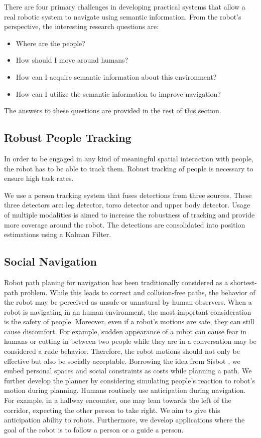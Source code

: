 \documentclass[12pt]{gatech-thesis}
\begin{document}
There are four primary challenges in developing practical systems that allow a real robotic system to navigate using semantic information. From the robot's perspective, the interesting research questions are:

\begin{itemize}
\item Where are the people?
\item How should I move around humans?
\item How can I acquire semantic information about this environment?
\item How can I utilize the semantic information to improve navigation?
\end{itemize}

The answers to these questions are provided in the rest of this section.

\subsection{Robust People Tracking}

In order to be engaged in any kind of meaningful spatial interaction with people, the robot has to be able to track them. Robust tracking of people is necessary to ensure high task rates.

We use a person tracking system that fuses detections from three sources. These three detectors are: leg detector, torso detector and upper body detector. Usage of multiple modalities is aimed to increase the robustness of tracking and provide more coverage around the robot. The detections are consolidated into position estimations using a Kalman Filter.

\subsection{Social Navigation}

Robot path planing for navigation has been traditionally considered as a shortest-path problem. While this leads to correct and collision-free paths, the behavior of the robot may be perceived as unsafe or unnatural by human observers. When a robot is navigating in an human environment, the most important consideration is the safety of people. Moreover, even if a robot's motions are safe, they can still cause discomfort. For example, sudden appearance of a robot can cause fear in humans or cutting in between two people while they are in a conversation may be considered a rude behavior. Therefore, the robot motions should not only be effective but also be socially acceptable.
Borrowing the idea from Sisbot \cite{sisbot2007human}, we embed personal spaces and social constraints as costs while planning a path. We further develop the planner by considering simulating people's reaction to robot's motion during planning. Humans routinely use anticipation during navigation. For example, in a hallway encounter, one may lean towards the left of the corridor, expecting the other person to take right. We aim to give this anticipation ability to robots. Furthermore, we develop applications where the goal of the robot is to follow a person or a guide a person.
\end{document}
